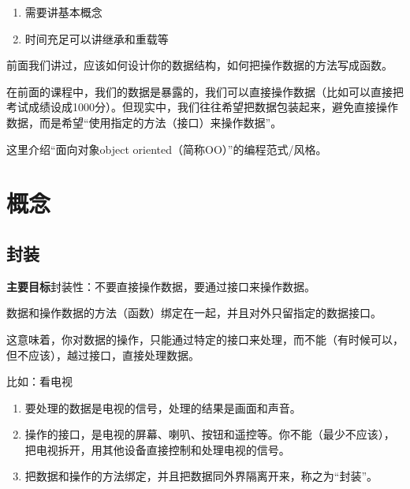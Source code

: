 \documentclass[
  letterpaper,
  DIV=11,
  numbers=noendperiod]{scrreprt}
\providecommand{\tightlist}{%
  \setlength{\itemsep}{0pt}\setlength{\parskip}{0pt}}\usepackage{longtable,booktabs,array}
\begin{document}
\begin{tcolorbox}[enhanced jigsaw, opacityback=0, left=2mm, coltitle=black, leftrule=.75mm, bottomtitle=1mm, arc=.35mm, opacitybacktitle=0.6, bottomrule=.15mm, breakable, colbacktitle=quarto-callout-note-color!10!white, toprule=.15mm, toptitle=1mm, colframe=quarto-callout-note-color-frame, titlerule=0mm, title=\textcolor{quarto-callout-note-color}{\faInfo}\hspace{0.5em}{Note}, rightrule=.15mm, colback=white]

\begin{enumerate}
\def\labelenumi{\arabic{enumi}.}
\tightlist
\item
  需要讲基本概念
\item
  时间充足可以讲继承和重载等
\end{enumerate}

\end{tcolorbox}

前面我们讲过，应该如何设计你的数据结构，如何把操作数据的方法写成函数。

在前面的课程中，我们的数据是暴露的，我们可以直接操作数据（比如可以直接把考试成绩设成1000分）。但现实中，我们往往希望把数据包装起来，避免直接操作数据，而是希望``使用指定的方法（接口）来操作数据''。

这里介绍``面向对象object oriented（简称OO）''的编程范式/风格。

\hypertarget{ux6982ux5ff5}{%
\section{概念}\label{ux6982ux5ff5}}

\hypertarget{ux5c01ux88c5}{%
\subsection{封装}\label{ux5c01ux88c5}}

\textbf{主要目标}封装性：不要直接操作数据，要通过接口来操作数据。

数据和操作数据的方法（函数）绑定在一起，并且对外只留指定的数据接口。

这意味着，你对数据的操作，只能通过特定的接口来处理，而不能（有时候可以，但不应该），越过接口，直接处理数据。

比如：看电视

\begin{enumerate}
\def\labelenumi{\arabic{enumi}.}
\tightlist
\item
  要处理的数据是电视的信号，处理的结果是画面和声音。
\item
  操作的接口，是电视的屏幕、喇叭、按钮和遥控等。你不能（最少不应该），把电视拆开，用其他设备直接控制和处理电视的信号。
\item
  把数据和操作的方法绑定，并且把数据同外界隔离开来，称之为``封装''。
\end{enumerate}
\end{document}
